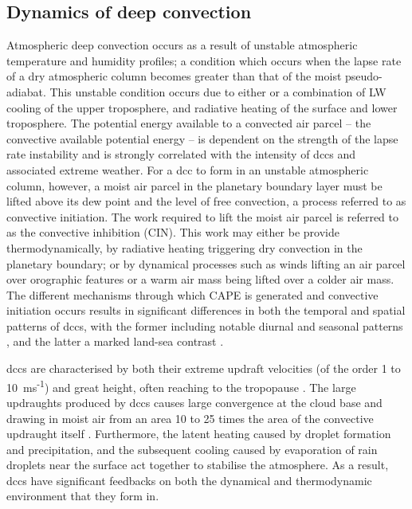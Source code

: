 \subsection{Dynamics of deep convection}

Atmospheric deep convection occurs as a result of unstable atmospheric temperature and humidity profiles; a condition which occurs when the lapse rate of a dry atmospheric column becomes greater than that of the moist pseudo-adiabat.
This unstable condition occurs due to either or a combination of LW cooling of the upper troposphere, and radiative heating of the surface and lower troposphere.
The potential energy available to a convected air parcel -- the convective available potential energy -- is dependent on the strength of the lapse rate instability and is strongly correlated with the intensity of \acrshort{dcc}s and associated extreme weather.
For a \acrshort{dcc} to form in an unstable atmospheric column, however, a moist air parcel in the planetary boundary layer must be lifted above its dew point and the level of free convection, a process referred to as convective initiation.
The work required to lift the moist air parcel is referred to as the convective inhibition (CIN).
This work may either be provide thermodynamically, by radiative heating triggering dry convection in the planetary boundary; or by dynamical processes such as winds lifting an air parcel over orographic features or a warm air mass being lifted over a colder air mass.
The different mechanisms through which CAPE is generated and convective initiation occurs results in significant differences in both the temporal and spatial patterns of \acrshort{dcc}s, with the former including notable diurnal and seasonal patterns \citep{chen_diurnal_1997}, and the latter a marked land-sea contrast \citep{taylor_evaluating_2017}.

\acrshort{dcc}s are characterised by both their extreme updraft velocities (of the order 1 to 10~ms\textsuperscript{-1}) and great height, often reaching to the tropopause \citep{weisman_mesoscale_2015}.
The large updraughts produced by \acrshort{dcc}s causes large convergence at the cloud base and drawing in moist air from an area 10 to 25 times the area of the convective updraught itself \citep{trenberth_changing_2003}.
Furthermore, the latent heating caused by droplet formation and precipitation, and the subsequent cooling caused by evaporation of rain droplets near the surface act together to stabilise the atmosphere.
As a result, \acrshort{dcc}s have significant feedbacks on both the dynamical and thermodynamic environment that they form in.



